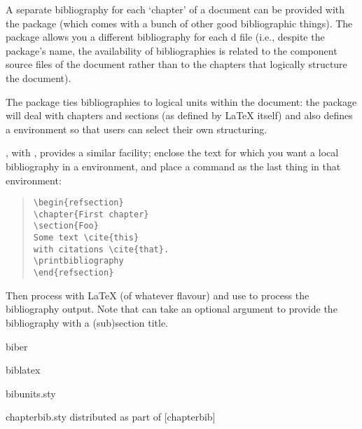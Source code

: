 
A separate bibliography for each `chapter' of a document can be provided
with the package  (which comes with a bunch of
other good bibliographic things).  The package allows you a
different bibliography for each d file (i.e., despite the
package's name, the availability of bibliographies is related to the
component source files of the document rather than to the chapters that
logically structure the document).

The package  ties bibliographies to logical units
within the document: the package will deal with chapters and sections
(as defined by \LaTeX{} itself) and also defines a 
environment so that users can select their own structuring.

, with
, provides a similar facility; enclose the text for
which you want a local bibliography in a 
environment, and place a  command as the last
thing in that environment:
\begin{quote}
\begin{verbatim}
\begin{refsection}
\chapter{First chapter}
\section{Foo}
Some text \cite{this}
with citations \cite{that}.
\printbibliography
\end{refsection}
\end{verbatim}
\end{quote}
Then process with \LaTeX{} (of whatever flavour) and use
 to process the bibliography output.  Note that
 can take an optional argument
 to provide the bibliography with a
(sub)section title.
\begin{ctanrefs}
\item[biber]
\item[biblatex]
\item[bibunits.sty]
\item[chapterbib.sty]distributed as part of [chapterbib]
\end{ctanrefs}

